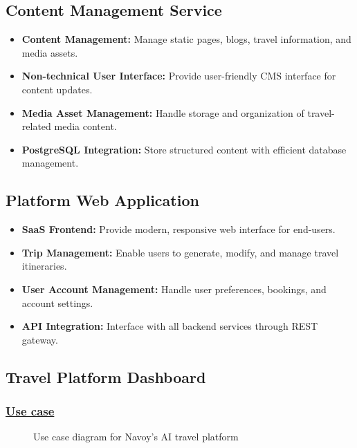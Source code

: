 \subsection{Content Management Service}
\begin{itemize}
    \item \textbf{Content Management:} Manage static pages, blogs, travel information, and media assets.
    \item \textbf{Non-technical User Interface:} Provide user-friendly CMS interface for content updates.
    \item \textbf{Media Asset Management:} Handle storage and organization of travel-related media content.
    \item \textbf{PostgreSQL Integration:} Store structured content with efficient database management.
\end{itemize}

\subsection{Platform Web Application}
\begin{itemize}
    \item \textbf{SaaS Frontend:} Provide modern, responsive web interface for end-users.
    \item \textbf{Trip Management:} Enable users to generate, modify, and manage travel itineraries.
    \item \textbf{User Account Management:} Handle user preferences, bookings, and account settings.
    \item \textbf{API Integration:} Interface with all backend services through REST gateway.
\end{itemize}

\subsection{Travel Platform Dashboard}

\subsubsection*{\underline{Use case}}
\begin{figure}[H]
    \centering
    \caption{Use case diagram for Navoy's AI travel platform}
    \label{fig:use-case-diagram}
\end{figure}

